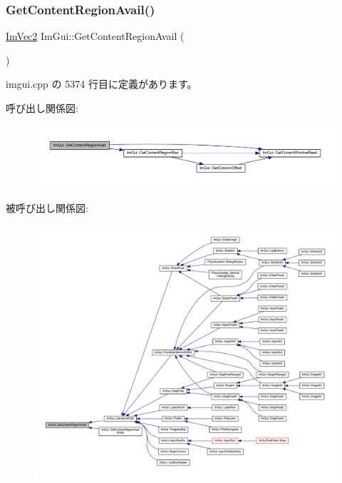 \subsubsection{\texorpdfstring{Get\+Content\+Region\+Avail()}{GetContentRegionAvail()}}
{\footnotesize\ttfamily \mbox{\hyperlink{struct_im_vec2}{Im\+Vec2}} Im\+Gui\+::\+Get\+Content\+Region\+Avail (\begin{DoxyParamCaption}{ }\end{DoxyParamCaption})}



 imgui.\+cpp の 5374 行目に定義があります。

呼び出し関係図\+:\nopagebreak
\begin{figure}[H]
\begin{center}
\leavevmode
\includegraphics[width=350pt]{namespace_im_gui_a410c8e19b2fea8b52746ca11b3930301_cgraph}
\end{center}
\end{figure}
被呼び出し関係図\+:\nopagebreak
\begin{figure}[H]
\begin{center}
\leavevmode
\includegraphics[width=350pt]{namespace_im_gui_a410c8e19b2fea8b52746ca11b3930301_icgraph}
\end{center}
\end{figure}
\mbox{\label{namespace_im_gui_a52e3311f46626a5d0369139d20da993a}} 

